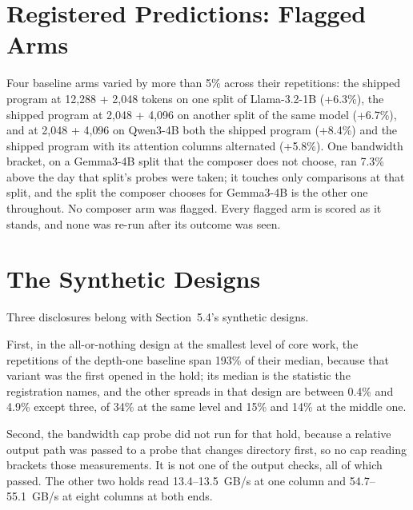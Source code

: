 \section{Registered Predictions: Flagged Arms}
\label{app:flags}

Four baseline arms varied by more than 5\% across their repetitions: the shipped program at 12{,}288 + 2{,}048 tokens on
one split of Llama-3.2-1B (+6.3\%), the shipped program at 2{,}048 + 4{,}096 on another split of the same model
(+6.7\%), and at 2{,}048 + 4{,}096 on Qwen3-4B both the shipped program (+8.4\%) and the shipped program with its
attention columns alternated (+5.8\%). One bandwidth bracket, on a Gemma3-4B split that the composer does not choose,
ran 7.3\% above the day that split's probes were taken; it touches only comparisons at that split, and the split the
composer chooses for Gemma3-4B is the other one throughout. No composer arm was flagged. Every flagged arm is scored
as it stands, and none was re-run after its outcome was seen.

\section{The Synthetic Designs}
\label{app:synthetic}

Three disclosures belong with Section~5.4's synthetic designs.

First, in the all-or-nothing design at the smallest level of core work, the repetitions of the depth-one baseline span
193\% of their median, because that variant was the first opened in the hold; its median is the statistic the
registration names, and the other spreads in that design are between 0.4\% and 4.9\% except three, of 34\% at the same level and 15\% and 14\% at the middle one.

Second, the bandwidth cap probe did not run for that hold, because a relative output path was passed to a probe that
changes directory first, so no cap reading brackets those measurements. It is not one of the output checks, all of
which passed. The other two holds read 13.4--13.5~GB/s at one column and 54.7--55.1~GB/s at eight columns at both ends.


